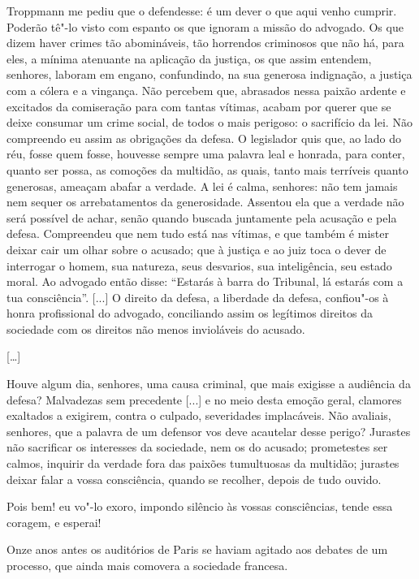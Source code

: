 \begin{hedraquote}
Troppmann me pediu que o
defendesse: é um dever o que aqui venho cumprir. Poderão tê"-lo visto
com espanto os que ignoram a missão do advogado. Os que dizem haver
crimes tão abomináveis, tão horrendos criminosos que não há, para eles,
a mínima atenuante na aplicação da justiça, os que assim entendem,
senhores, laboram em engano, confundindo, na sua generosa indignação, a
justiça com a cólera e a vingança. Não percebem que, abrasados nessa
paixão ardente e excitados da comiseração para com tantas vítimas,
acabam por querer que se deixe consumar um crime social, de todos o
mais perigoso: o sacrifício da lei. Não compreendo eu assim as
obrigações da defesa. O legislador quis que, ao lado do réu, fosse quem
fosse, houvesse sempre uma palavra leal e honrada, para conter, quanto
ser possa, as comoções da multidão, as quais, tanto mais terríveis
quanto generosas, ameaçam abafar a verdade. A lei é calma, senhores:
não tem jamais nem sequer os arrebatamentos da generosidade. Assentou
ela que a verdade não será possível de achar, senão quando buscada
juntamente pela acusação e pela defesa. Compreendeu que nem tudo está
nas vítimas, e que também é mister deixar cair um olhar sobre o
acusado; que à justiça e ao juiz toca o dever de interrogar o homem,
sua natureza, seus desvarios, sua inteligência, seu estado moral. Ao
advogado então disse: “Estarás à barra do Tribunal, lá estarás com a
tua consciência”. [...] O direito da defesa, a liberdade da defesa,
confiou"-os à honra profissional do advogado, conciliando assim os
legítimos direitos da sociedade com os direitos não menos invioláveis
do acusado.

[\ldots]

Houve algum dia, senhores, uma causa criminal, que mais exigisse a
audiência da defesa? Malvadezas sem precedente [...] e no meio desta
emoção geral, clamores exaltados a exigirem, contra o culpado,
severidades implacáveis. Não avaliais, senhores, que a palavra de um
defensor vos deve acautelar desse perigo? Jurastes não sacrificar os
interesses da sociedade, nem os do acusado; prometestes ser calmos,
inquirir da verdade fora das paixões tumultuosas da multidão; jurastes
deixar falar a vossa consciência, quando se recolher, depois de tudo
ouvido. 

Pois bem! eu vo"-lo exoro, impondo silêncio às vossas
consciências, tende essa coragem, e esperai! 
\end{hedraquote}

Onze anos antes os auditórios de Paris se haviam agitado 
aos debates de um processo, que ainda mais comovera a sociedade francesa. 

